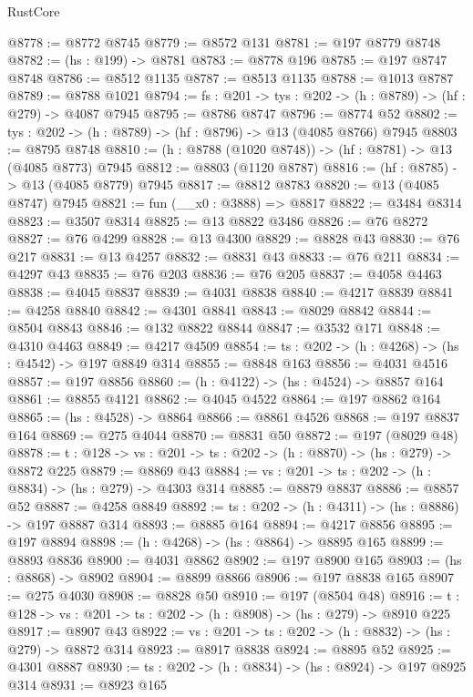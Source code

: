 \begin{lexlean}{RustCore}
\begin{coremodule}
@8778 := @8772 @8745
@8779 := @8572 @131
@8781 := @197 @8779 @8748
@8782 := (hs : @199) -> @8781
@8783 := @8778 @196
@8785 := @197 @8747 @8748
@8786 := @8512 @1135
@8787 := @8513 @1135
@8788 := @1013 @8787
@8789 := @8788 @1021
@8794 := {fs : @201} -> {tys : @202} -> (h : @8789) -> (hf : @279) -> @4087 @7945
@8795 := @8786 @8747
@8796 := @8774 @52
@8802 := {tys : @202} -> (h : @8789) -> (hf : @8796) -> @13 (@4085 @8766) @7945
@8803 := @8795 @8748
@8810 := (h : @8788 (@1020 @8748)) -> (hf : @8781) -> @13 (@4085 @8773) @7945
@8812 := @8803 (@1120 @8787)
@8816 := (hf : @8785) -> @13 (@4085 @8779) @7945
@8817 := @8812 @8783
@8820 := @13 (@4085 @8747) @7945
@8821 := fun (__x0 : @3888) => @8817
@8822 := @3484 @8314
@8823 := @3507 @8314
@8825 := @13 @8822 @3486
@8826 := @76 @8272
@8827 := @76 @4299
@8828 := @13 @4300
@8829 := @8828 @43
@8830 := @76 @217
@8831 := @13 @4257
@8832 := @8831 @43
@8833 := @76 @211
@8834 := @4297 @43
@8835 := @76 @203
@8836 := @76 @205
@8837 := @4058 @4463
@8838 := @4045 @8837
@8839 := @4031 @8838
@8840 := @4217 @8839
@8841 := @4258 @8840
@8842 := @4301 @8841
@8843 := @8029 @8842
@8844 := @8504 @8843
@8846 := @132 @8822 @8844
@8847 := @3532 @171
@8848 := @4310 @4463
@8849 := @4217 @4509
@8854 := {ts : @202} -> (h : @4268) -> (hs : @4542) -> @197 @8849 @314
@8855 := @8848 @163
@8856 := @4031 @4516
@8857 := @197 @8856
@8860 := (h : @4122) -> (hs : @4524) -> @8857 @164
@8861 := @8855 @4121
@8862 := @4045 @4522
@8864 := @197 @8862 @164
@8865 := (hs : @4528) -> @8864
@8866 := @8861 @4526
@8868 := @197 @8837 @164
@8869 := @275 @4044
@8870 := @8831 @50
@8872 := @197 (@8029 @48)
@8878 := {t : @128} -> {vs : @201} -> {ts : @202} -> (h : @8870) -> (hs : @279) -> @8872 @225
@8879 := @8869 @43
@8884 := {vs : @201} -> {ts : @202} -> (h : @8834) -> (hs : @279) -> @4303 @314
@8885 := @8879 @8837
@8886 := @8857 @52
@8887 := @4258 @8849
@8892 := {ts : @202} -> (h : @4311) -> (hs : @8886) -> @197 @8887 @314
@8893 := @8885 @164
@8894 := @4217 @8856
@8895 := @197 @8894
@8898 := (h : @4268) -> (hs : @8864) -> @8895 @165
@8899 := @8893 @8836
@8900 := @4031 @8862
@8902 := @197 @8900 @165
@8903 := (hs : @8868) -> @8902
@8904 := @8899 @8866
@8906 := @197 @8838 @165
@8907 := @275 @4030
@8908 := @8828 @50
@8910 := @197 (@8504 @48)
@8916 := {t : @128} -> {vs : @201} -> {ts : @202} -> (h : @8908) -> (hs : @279) -> @8910 @225
@8917 := @8907 @43
@8922 := {vs : @201} -> {ts : @202} -> (h : @8832) -> (hs : @279) -> @8872 @314
@8923 := @8917 @8838
@8924 := @8895 @52
@8925 := @4301 @8887
@8930 := {ts : @202} -> (h : @8834) -> (hs : @8924) -> @197 @8925 @314
@8931 := @8923 @165

\end{coremodule}
\end{lexlean}
